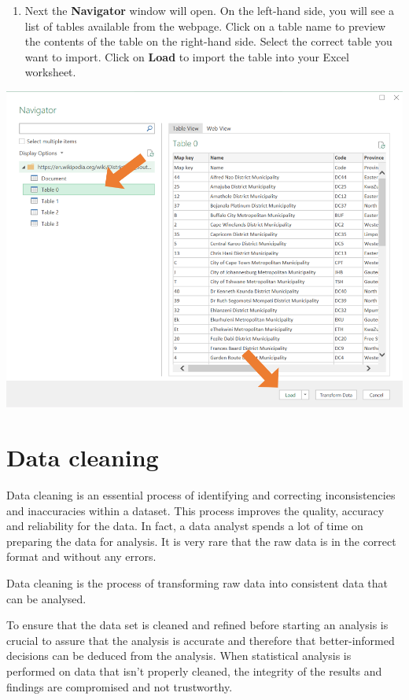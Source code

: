 \documentclass[
]{book}
\providecommand{\tightlist}{%
  \setlength{\itemsep}{0pt}\setlength{\parskip}{0pt}}
\begin{document}
\begin{enumerate}
\def\labelenumi{\arabic{enumi}.}
\setcounter{enumi}{2}
\tightlist
\item
  Next the \textbf{Navigator} window will open. On the left-hand side, you will see a list of tables available from the webpage. Click on a table name to preview the contents of the table on the right-hand side. Select the correct table you want to import. Click on \textbf{Load} to import the table into your Excel worksheet.
\end{enumerate}

\begin{center}\includegraphics[width=0.7\linewidth]{Figures/web_3} \end{center}

\section{Data cleaning}\label{data-cleaning}

Data cleaning is an essential process of identifying and correcting inconsistencies and inaccuracies within a dataset. This process improves the quality, accuracy and reliability for the data. In fact, a data analyst spends a lot of time on preparing the data for analysis. It is very rare that the raw data is in the correct format and without any errors.

Data cleaning is the process of transforming raw data into consistent data that can be analysed.

To ensure that the data set is cleaned and refined before starting an analysis is crucial to assure that the analysis is accurate and therefore that better-informed decisions can be deduced from the analysis. When statistical analysis is performed on data that isn't properly cleaned, the integrity of the results and findings are compromised and not trustworthy.
\end{document}
